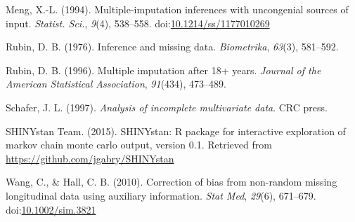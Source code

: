 \documentclass[]{article}
\begin{document}
Meng, X.-L. (1994). Multiple-imputation inferences with uncongenial
sources of input. \emph{Statist. Sci.}, \emph{9}(4), 538--558.
doi:\href{http://dx.doi.org/10.1214/ss/1177010269}{10.1214/ss/1177010269}

Rubin, D. B. (1976). Inference and missing data. \emph{Biometrika},
\emph{63}(3), 581--592.

Rubin, D. B. (1996). Multiple imputation after 18+ years. \emph{Journal
of the American Statistical Association}, \emph{91}(434), 473--489.

Schafer, J. L. (1997). \emph{Analysis of incomplete multivariate data}.
CRC press.

SHINYstan Team. (2015). SHINYstan: R package for interactive exploration
of markov chain monte carlo output, version 0.1. Retrieved from
\url{https://github.com/jgabry/SHINYstan}

Wang, C., \& Hall, C. B. (2010). Correction of bias from non-random
missing longitudinal data using auxiliary information. \emph{Stat Med},
\emph{29}(6), 671--679.
doi:\href{http://dx.doi.org/10.1002/sim.3821}{10.1002/sim.3821}
\end{document}

